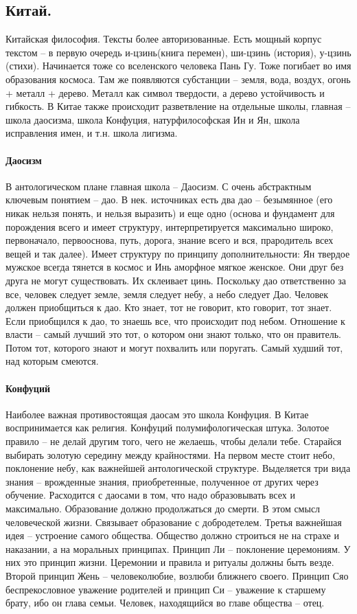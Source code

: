 \documentclass[a4paper, 12pt]{article}
\begin{document}
\subsection{Китай.} Китайская философия. Тексты более авторизованные. Есть мощный корпус текстом -- в первую очередь и-цзинь(книга перемен), ши-цзинь (история), у-цзинь (стихи). Начинается тоже со вселенского человека Пань Гу. Тоже погибает во имя образования космоса. Там же появляются субстанции -- земля, вода, воздух, огонь + металл + дерево. Металл как символ твердости, а дерево устойчивость и гибкость. В Китае также происходит разветвление на отдельные школы, главная -- школа даосизма, школа Конфуция, натурфилософская Ин и Ян, школа исправления имен, и т.н. школа лигизма. 

\paragraph{Даосизм}
В антологическом плане главная школа -- Даосизм. С очень абстрактным ключевым понятием -- дао. В нек. источниках есть два дао -- безымянное (его никак нельзя понять, и нельзя выразить) и еще одно (основа и фундамент для порождения всего и имеет структуру, интерпретируется максимально широко, первоначало, первооснова, путь, дорога, знание всего и вся, прародитель всех вещей и так далее). Имеет структуру по принципу дополнительности: Ян твердое мужское всегда тянется в космос и Инь аморфное мягкое женское. Они друг без друга не могут существовать. Их склеивает цинь. Поскольку дао ответственно за все, человек следует земле, земля следует небу, а небо следует Дао. Человек должен приобщиться к дао. Кто знает, тот не говорит, кто говорит, тот знает. Если приобщился к дао, то знаешь все, что происходит под небом. Отношение к власти -- самый лучший это тот, о котором они знают только, что он правитель. Потом тот, которого знают и могут похвалить или поругать. Самый худший тот, над которым смеются. 

\paragraph{Конфуций}
Наиболее важная противостоящая даосам это школа Конфуция. В Китае воспринимается как религия. Конфуций полумифологическая штука. Золотое правило -- не делай другим того, чего не желаешь, чтобы делали тебе. Старайся выбирать золотую середину между крайностями. На первом месте стоит небо, поклонение небу, как важнейшей антологической структуре. Выделяется три вида знания -- врожденные знания, приобретенные, полученное от других через обучение. Расходится с даосами в том, что надо образовывать всех и максимально. Образование должно продолжаться до смерти. В этом смысл человеческой жизни. Связывает образование с добродетелем. Третья важнейшая идея -- устроение самого общества. Общество должно строиться не на страхе и наказании, а на моральных принципах. Принцип Ли -- поклонение церемониям. У них это принцип жизни. Церемонии и правила и ритуалы должны быть везде. Второй принцип Жень -- человеколюбие, возлюби ближнего своего. Принцип Сяо беспрекословное уважение родителей и принцип Си -- уважение к старшему брату, ибо он глава семьи. Человек, находящийся во главе общества -- отец.
\end{document}
